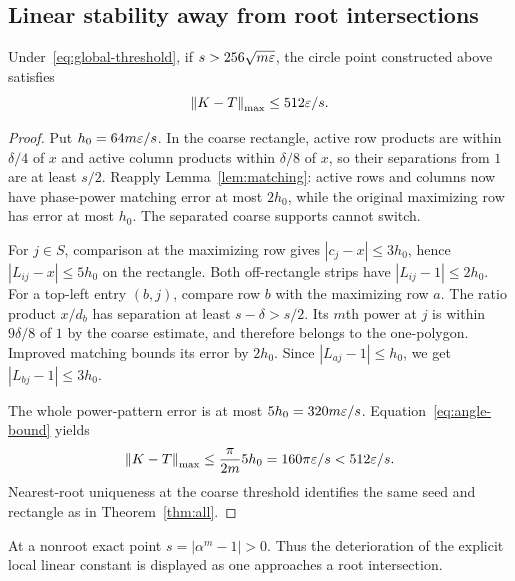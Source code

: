 \subsection{Linear stability away from root intersections}
\begin{proposition}\label{prop:nonroot}
Under~\eqref{eq:global-threshold}, if $s>256\sqrt{m\varepsilon}$, the circle point constructed above satisfies
\begin{equation}\label{eq:nonrootlinear}
 \left\lVert K-T\right\rVert_{\mathrm{max}}\le512\varepsilon/s.
\end{equation}
\end{proposition}
\begin{proof}
Put $h_0=64m\varepsilon/s$. In the coarse rectangle, active row products are within $\delta/4$ of $x$ and active column products within $\delta/8$ of $x$, so their separations from $1$ are at least $s/2$. Reapply Lemma~\ref{lem:matching}: active rows and columns now have phase-power matching error at most $2h_0$, while the original maximizing row has error at most $h_0$. The separated coarse supports cannot switch.

For $j\in S$, comparison at the maximizing row gives $|c_j-x|\le3h_0$, hence $|L_{ij}-x|\le5h_0$ on the rectangle. Both off-rectangle strips have $|L_{ij}-1|\le2h_0$. For a top-left entry $(b,j)$, compare row $b$ with the maximizing row $a$. The ratio product $x/d_b$ has separation at least $s-\delta>s/2$. Its $m$th power at $j$ is within $9\delta/8$ of $1$ by the coarse estimate, and therefore belongs to the one-polygon. Improved matching bounds its error by $2h_0$. Since $|L_{aj}-1|\le h_0$, we get $|L_{bj}-1|\le3h_0$.

The whole power-pattern error is at most $5h_0=320m\varepsilon/s$. Equation~\eqref{eq:angle-bound} yields
\[
 \left\lVert K-T\right\rVert_{\mathrm{max}}\le\frac\pi{2m}5h_0=160\pi\varepsilon/s<512\varepsilon/s.
\]
Nearest-root uniqueness at the coarse threshold identifies the same seed and rectangle as in Theorem~\ref{thm:all}.
\end{proof}
At a nonroot exact point $s=|\alpha^m-1|>0$. Thus the deterioration of the explicit local linear constant is displayed as one approaches a root intersection.

